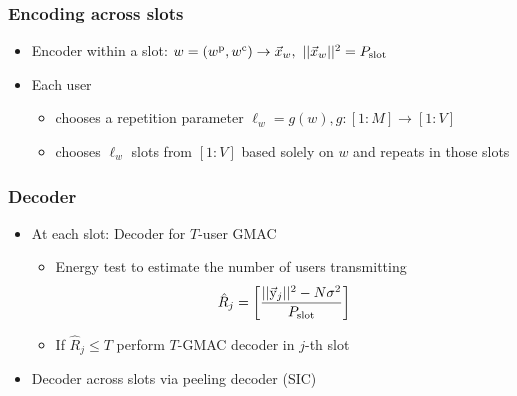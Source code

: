 \begin{frame}
\frametitle{Encoding across slots}
\begin{itemize}
	\item Encoder within a slot: $w=(w^\mathrm{p},w^\mathrm{c})\rightarrow \vec{x}_w,~||\vec{x}_w||^2=P_{\text{slot}}$
	\item Each user 
	\begin{itemize}
		\item chooses a repetition parameter $\ell_{w}=g(w), g:[1:M] \rightarrow [1:V]$ 
		\item chooses $\ell_{w}$ slots from $[1:V]$ based solely on $w$ and repeats in those slots
	\end{itemize}
\end{itemize}
	\centering
\resizebox{0.7\textwidth}{!}{}	
\end{frame}


\begin{frame}
\frametitle{Decoder}
\begin{itemize}
\item At each slot: Decoder for $T$-user GMAC
	\begin{itemize}
	\item Energy test to estimate the number of users transmitting
	\[
	\hat{R}_{j}= \left[\frac{||\vec{\mathrm{y}}_j||^2-N\sigma^2}{P_{\text{slot}}}\right]
	\]
	\item If $	\hat{R}_{j}\leq T$ perform $T$-GMAC decoder in $j$-th slot 
	\end{itemize}
\item Decoder across slots via peeling decoder (SIC)
\end{itemize}
\vspace{2ex}
\centering
\resizebox{0.7\textwidth}{!}{}	
\end{frame}

